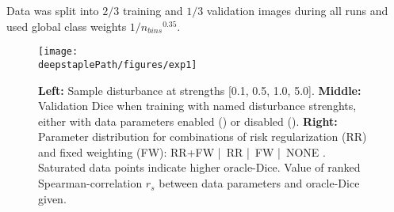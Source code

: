     Data was split into \(2/3\) training and \(1/3\) validation images during all runs and used global class weights \(1/{n_{bins}}^{0.35}\).


    \begin{figure}
        \centering
        \texttt{[image: \\deepstaplePath/figures/exp1]}
        \caption{\textbf{Left:} Sample disturbance  at strengths [0.1, 0.5, 1.0, 5.0]. \textbf{Middle:} Validation Dice when training with named disturbance strenghts, either with data parameters enabled (\sampleline{}) or disabled (). \textbf{Right:} Parameter distribution for combinations of risk regularization (RR) and fixed weighting (FW): RR+FW  |~RR  |~FW   |~NONE . Saturated data points indicate higher oracle-Dice. Value of ranked Spearman-correlation \(r_s\) between data parameters and oracle-Dice given.}
        \label{fig:exp1_deepstaple}
    \end{figure}

